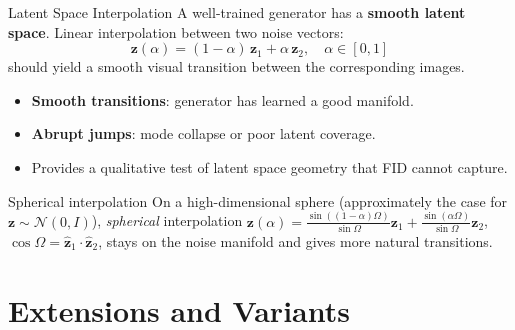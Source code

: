 \documentclass[aspectratio=169,11pt]{beamer}
\newcommand{\bz}{\bm{z}}
\begin{document}
\begin{frame}{Latent Space Interpolation}
  A well-trained generator has a \textbf{smooth latent space}.
  Linear interpolation between two noise vectors:
  \[
    \bz(\alpha) = (1-\alpha)\,\bz_1 + \alpha\,\bz_2,
    \quad \alpha\in[0,1]
  \]
  should yield a smooth visual transition between the corresponding images.

  \medskip
  \begin{itemize}
    \item \textbf{Smooth transitions}: generator has learned a good manifold.
    \item \textbf{Abrupt jumps}: mode collapse or poor latent coverage.
    \item Provides a qualitative test of latent space geometry that FID cannot capture.
  \end{itemize}

  \begin{alertblock}{Spherical interpolation}
    On a high-dimensional sphere (approximately the case for $\bz\sim\mathcal{N}(0,I)$),
    \emph{spherical} interpolation
    $\bz(\alpha) = \tfrac{\sin((1-\alpha)\Omega)}{\sin\Omega}\bz_1
                 + \tfrac{\sin(\alpha\Omega)}{\sin\Omega}\bz_2$,
    $\cos\Omega=\hat{\bz}_1\cdot\hat{\bz}_2$,
    stays on the noise manifold and gives more natural transitions.
  \end{alertblock}
\end{frame}

\section{Extensions and Variants}
\end{document}
